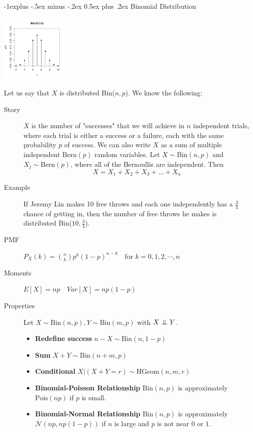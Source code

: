 \documentclass[10pt,landscape]{article}
\makeatletter
\newcommand\independent{\protect\mathpalette{\protect\independenT}{\perp}}
\def\independenT#1#2{\mathrel{\setbox0\hbox{$#1#2$}%
\copy0\kern-\wd0\mkern4mu\box0}}
\newcommand{\N}{\mathcal{N}}
\newcommand{\Bern}{\textrm{Bern}}
\newcommand{\Bin}{\textrm{Bin}}
\newcommand{\Pois}{\textrm{Pois}}
\newcommand{\HGeom}{\textrm{HGeom}}
\renewcommand{\subsection}{\@startsection{subsection}{2}{0mm}%
{-1explus -.5ex minus -.2ex}%
{0.5ex plus .2ex}%
{\normalfont\normalsize\bfseries}}
\makeatother
\begin{document}
\begin{multicols*}{3}
        \subsection{Binomial Distribution}
        \begin{minipage}{\linewidth}
            \centering
            \includegraphics[width=1.3in]{figures/Bin10_05.pdf}
        \end{minipage}

        Let us say that $X$ is distributed \Bin($n,p$). We know the following:
        \begin{description}
            \item[Story] $X$ is the number of "successes" that we will achieve in $n$ independent trials, where each trial is either a success or a failure, each with the same probability $p$ of success. We can also write $X$ as a sum of multiple independent $\Bern(p)$ random variables. Let $X \sim \Bin(n, p)$ and $X_j \sim \Bern(p)$, where all of the Bernoullis are independent. Then
            \[X = X_1 + X_2 + X_3 + \dots + X_n\]
            \item[Example] If Jeremy Lin makes 10 free throws and each one independently has a $\frac{3}{4}$ chance of getting in, then the number of free throws he makes is distributed  \Bin($10,\frac{3}{4}$).
            \item[PMF] $P_X(k) = {n  \choose k} p^k(1-p)^{n-k} \quad \text{for  } k=0,1,2,\cdots,n$
            \item[Moments] $E[X] = np \quad Var[X] = np(1-p)$
            \item[Properties] Let $X \sim \Bin(n,p), Y \sim \Bin(m,p)$ with $X \independent Y$.
            \begin{itemize}
                \item \textbf{Redefine success} $n-X \sim \Bin(n,1-p)$
                \item \textbf{Sum} $X+Y \sim \Bin(n+m,p)$
                \item \textbf{Conditional} $X|(X+Y=r) \sim \HGeom(n,m,r)$
                \item \textbf{Binomial-Poisson Relationship} $\Bin(n, p)$ is approximately  $\Pois(np)$ if $p$ is small.
                \item \textbf{Binomial-Normal Relationship} $\Bin(n, p)$ is approximately $\N(np,np(1-p))$ if $n$ is large and $p$ is not near $0$ or $1$.
            \end{itemize}
        \end{description}


\end{multicols*}
\end{document}
